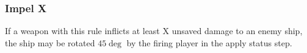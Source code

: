 \subsubsection{Impel X}
If a weapon with this rule inflicts at least X unsaved damage to an enemy ship, the ship may be rotated $45\deg$ by the firing player in the apply status step.